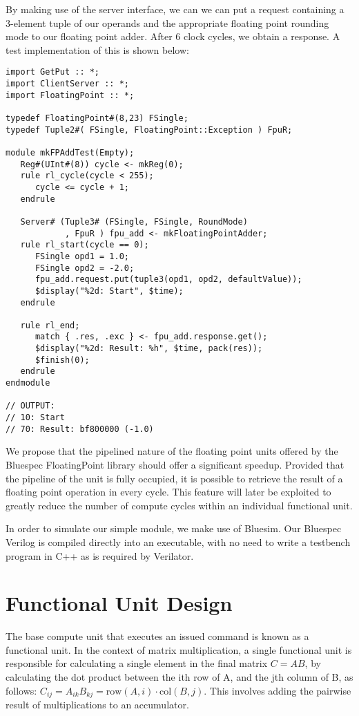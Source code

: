 \documentclass[a4paper,8pt]{report}
\begin{document}
By making use of the server interface, we can we can put a request containing a
3-element tuple of our operands and the appropriate floating point rounding mode
to our floating point adder. After 6 clock cycles, we obtain a response. A test
implementation of this is shown below: \\

\tiny
\begin{verbatim}
import GetPut :: *;
import ClientServer :: *;
import FloatingPoint :: *;

typedef FloatingPoint#(8,23) FSingle;
typedef Tuple2#( FSingle, FloatingPoint::Exception ) FpuR;

module mkFPAddTest(Empty);
   Reg#(UInt#(8)) cycle <- mkReg(0);
   rule rl_cycle(cycle < 255);
      cycle <= cycle + 1;
   endrule

   Server# (Tuple3# (FSingle, FSingle, RoundMode)
            , FpuR ) fpu_add <- mkFloatingPointAdder;
   rule rl_start(cycle == 0);
      FSingle opd1 = 1.0;
      FSingle opd2 = -2.0;
      fpu_add.request.put(tuple3(opd1, opd2, defaultValue));
      $display("%2d: Start", $time);
   endrule

   rule rl_end;
      match { .res, .exc } <- fpu_add.response.get();
      $display("%2d: Result: %h", $time, pack(res)); 
      $finish(0);
   endrule
endmodule

// OUTPUT:
// 10: Start
// 70: Result: bf800000 (-1.0)
\end{verbatim}
\normalsize

We propose that the pipelined nature of the floating point units offered by the
Bluespec FloatingPoint library should offer a significant speedup. Provided that
the pipeline of the unit is fully occupied, it is possible to retrieve the result
of a floating point operation in every cycle. This feature will later be
exploited to greatly reduce the number of compute cycles within an individual
functional unit.

In order to simulate our simple module, we make use of Bluesim. Our Bluespec
Verilog is compiled directly into an executable, with no need to write a
testbench program in C++ as is required by Verilator. 

\section{Functional Unit Design}
The base compute unit that executes an issued command is known as a functional
unit. In the context of matrix multiplication, a single functional unit is
responsible for calculating a single element in the final matrix $C = AB$, by
calculating the dot product between the ith row of A, and the jth column of B,
as follows: $C_{ij} = A_{ik}B_{kj} = \text{row}(A,i) \cdot \text{col}(B,j)$.
This involves adding the pairwise result of multiplications to an accumulator.
\end{document}
